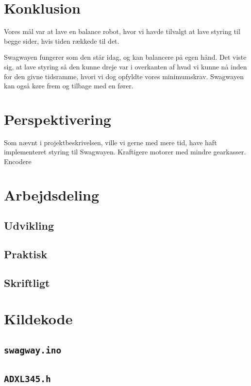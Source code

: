 \documentclass[a4paper,11pt,oneside,article,danish,table]{memoir}
\begin{document}
\chapter{Konklusion} \label{chap:kon}
Vores mål var at lave en balance robot, hvor vi havde tilvalgt at lave styring til begge sider, hvis tiden rækkede til det.

Swagwayen fungerer som den står idag, og kan balancere på egen hånd. Det viste sig, at lave styring så den kunne dreje var i overkanten af hvad vi kunne nå inden for den givne tidsramme, hvori vi dog opfyldte vores minimumskrav. Swagwayen kan også køre frem og tilbage med en fører.

\chapter{Perspektivering} \label{chap:per}
Som nævnt i projektbeskrivelsen, ville vi gerne med mere tid, have haft implementeret styring til Swagwayen. 
Kraftigere motorer med mindre gearkasser.
Encodere

\clearpage
\listoftables
\listoffigures
\nocite{*}
 
\clearpage \appendix

\chapter{Arbejdsdeling}

\section{Udvikling}
\section{Praktisk}
\section{Skriftligt}

\chapter{Kildekode}

\section{\texttt{swagway.ino}}

\section{\texttt{ADXL345.h}}

\end{document}
